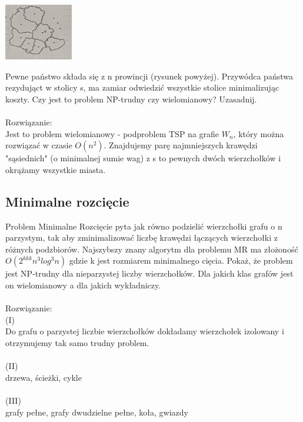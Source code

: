 \documentclass{article}
\begin{document}
\begin{center}
\includegraphics[width=3cm]{mapa}
\end{center}
Pewne państwo składa się z n prowincji (rysunek powyżej). Przywódca państwa rezydująct w stolicy s, 
ma zamiar odwiedzić wszystkie stolice minimalizując koszty.  
Czy jest to problem NP-trudny czy wielomianowy? Uzasadnij. \\\\Rozwiązanie:\\
Jest to problem wielomianowy - podproblem TSP na grafie $W_n$, który można rozwiązać w czasie $O(n^2)$.
Znajdujemy parę najmniejszych krawędzi "sąsiednich" (o minimalnej sumie wag) z s to pewnych dwóch wierzchołków i okrążamy wszystkie miasta.

\subsection*{Minimalne rozcięcie}
Problem Minimalne Rozcięcie pyta jak równo podzielić wierzchołki grafu o n parzystym, tak aby zminimalizować liczbę krawędzi łączących wierzchołki z różnych podzbiorów. 
Najszybszy znany algorytm dla problemu MR ma złożoność $O(2^{kkk}n^3log^3n)$ gdzie k jest rozmiarem minimalnego cięcia.  Pokaż, że problem jest NP-trudny dla nieparzystej liczby wierzchołków. 
Dla jakich klas grafów jest on wielomianowy a dla jakich wykładniczy.  \\\\Rozwiązanie:\\
(I) \\
Do grafu o parzystej liczbie wierzchołków dokładamy wierzchołek izolowany i otrzymujemy tak samo 
trudny problem. \\\\
(II)\\
drzewa, ścieżki, cykle \\\\
(III)\\
grafy pełne, grafy dwudzielne pełne, koła, gwiazdy
\end{document}
